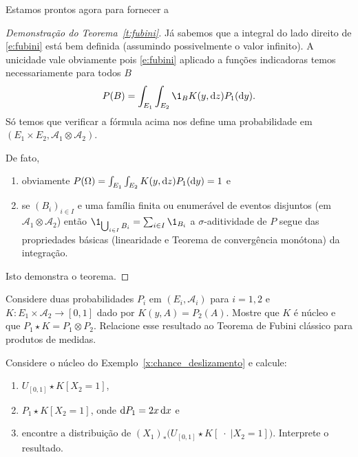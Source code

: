 Estamos prontos agora para fornecer a
\begin{proof}[Demonstração do Teorema~\ref{t:fubini}]
  Já sabemos que a integral do lado direito de \eqref{e:fubini} está bem definida (assumindo possivelmente o valor infinito).
  A unicidade vale obviamente pois \eqref{e:fubini} aplicado a funções indicadoras temos necessariamente para todos $B$
\begin{equation}
    P(B) = \int_{E_1} \int_{E_2} \1_{B} K(y, \d z) P_1 (\d y).
  \end{equation}
  Só temos que verificar a fórmula acima nos define uma probabilidade em $(E_1 \times E_2, \mathcal{A}_1 \otimes \mathcal{A}_2)$.

  De fato,
  \begin{enumerate}[\quad a)]
  \item obviamente $P(\Omega) = \int_{E_1} \int_{E_2}  K(y, \mathop{}\!\mathrm{d} z) P_1(\mathop{}\!\mathrm{d} y) = 1$ e
  \item se $(B_i)_{i\in I}$ e uma família finita ou enumerável de eventos disjuntos (em $\mathcal{A}_1 \otimes \mathcal{A}_2$) então
  $\1_{\bigcup_{i\in I} B_i}=\sum_{i\in I} \1_{B_i}$ a $\sigma$-aditividade de $P$ segue das propriedades básicas
  (linearidade e Teorema de convergência monótona) da integração.
  \end{enumerate}
  Isto demonstra o teorema.
\end{proof}

\begin{exercise}
  \label{x:nucleo_constante}
  Considere duas probabilidades $P_i$ em $(E_i, \mathcal{A}_i)$ para $i = 1,2$ e $K:E_1 \times \mathcal{A}_2 \to [0,1]$ dado por $K(y,A) = P_2(A)$.
  Mostre que $K$ é núcleo e que $P_1 \star K = P_1 \otimes P_2$.
  Relacione esse resultado ao Teorema de Fubini clássico para produtos de medidas.
\end{exercise}

\begin{exercise}
  Considere o núcleo do Exemplo~\ref{x:chance_deslizamento} e calcule:
  \begin{enumerate}[\quad a)]
  \item $U_{[0,1]} \star K [X_2 = 1]$,
  \item $P_1 \star K [X_2 = 1]$, onde $\mathop{}\!\mathrm{d} P_1 = 2x \mathop{}\!\mathrm{d} x$ e
  \item encontre a distribuição de $(X_1)_* \big( U_{[0,1]} \star K [\; \cdot \; | X_2 = 1] \big)$. Interprete o resultado.
  \end{enumerate}
\end{exercise}

